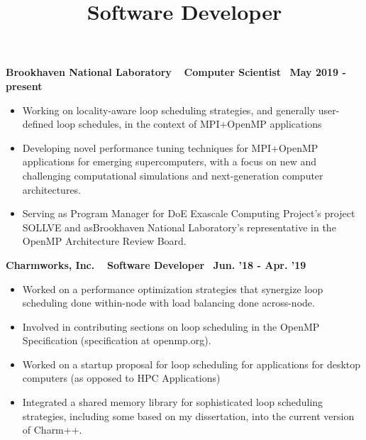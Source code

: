 \textbf{{Brookhaven National Laboratory $\>$$\>$$\>$$\>$Computer Scientist$\>$$\>$$\>$$\>$May 2019 - present}}
\begin{itemize}
    \item Working on locality-aware loop scheduling strategies, and generally user-defined loop schedules, in the context of MPI+OpenMP applications
    \item Developing novel performance tuning techniques for MPI+OpenMP applications for emerging supercomputers, with a focus on new and challenging computational simulations and next-generation computer architectures.
     \item   Serving as Program Manager for DoE Exascale Computing Project’s project SOLLVE and asBrookhaven National Laboratory’s representative in the OpenMP Architecture Review Board.
\end{itemize}

\title{Software Developer}
\textbf{Charmworks, Inc. $\>$$\>$$\>$$\>$Software Developer$\>$$\>$$\>$$\>$Jun. '18 - Apr. '19}
\vspace{0.0in}
\begin{itemize}
\item Worked on a performance optimization strategies that synergize loop scheduling done within-node with  load balancing done across-node. 
\item Involved in contributing sections on loop scheduling in the OpenMP Specification (specification at openmp.org).
\item Worked on a startup proposal for loop scheduling for applications for desktop computers (as opposed to HPC Applications) 
\item Integrated a shared memory library for sophisticated loop scheduling strategies, including some based on my dissertation, into the current version of Charm++.
\end{itemize}

